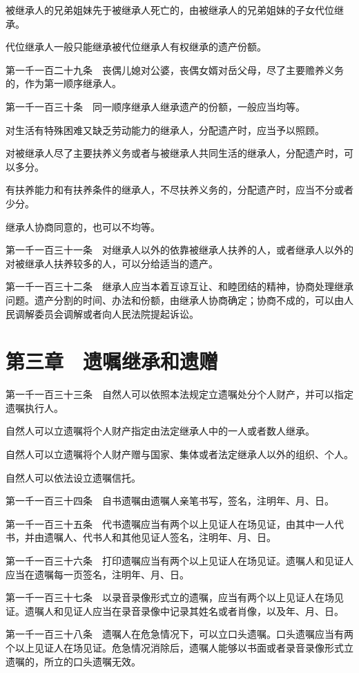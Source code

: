 \documentclass[UTF8,12pt,a4paper]{ctexbook}
\begin{document}
被继承人的兄弟姐妹先于被继承人死亡的，由被继承人的兄弟姐妹的子女代位继承。

代位继承人一般只能继承被代位继承人有权继承的遗产份额。

第一千一百二十九条　丧偶儿媳对公婆，丧偶女婿对岳父母，尽了主要赡养义务的，作为第一顺序继承人。

第一千一百三十条　同一顺序继承人继承遗产的份额，一般应当均等。

对生活有特殊困难又缺乏劳动能力的继承人，分配遗产时，应当予以照顾。

对被继承人尽了主要扶养义务或者与被继承人共同生活的继承人，分配遗产时，可以多分。

有扶养能力和有扶养条件的继承人，不尽扶养义务的，分配遗产时，应当不分或者少分。

继承人协商同意的，也可以不均等。

第一千一百三十一条　对继承人以外的依靠被继承人扶养的人，或者继承人以外的对被继承人扶养较多的人，可以分给适当的遗产。

第一千一百三十二条　继承人应当本着互谅互让、和睦团结的精神，协商处理继承问题。遗产分割的时间、办法和份额，由继承人协商确定；协商不成的，可以由人民调解委员会调解或者向人民法院提起诉讼。

\section*{第三章　遗嘱继承和遗赠}

第一千一百三十三条　自然人可以依照本法规定立遗嘱处分个人财产，并可以指定遗嘱执行人。

自然人可以立遗嘱将个人财产指定由法定继承人中的一人或者数人继承。

自然人可以立遗嘱将个人财产赠与国家、集体或者法定继承人以外的组织、个人。

自然人可以依法设立遗嘱信托。

第一千一百三十四条　自书遗嘱由遗嘱人亲笔书写，签名，注明年、月、日。

第一千一百三十五条　代书遗嘱应当有两个以上见证人在场见证，由其中一人代书，并由遗嘱人、代书人和其他见证人签名，注明年、月、日。

第一千一百三十六条　打印遗嘱应当有两个以上见证人在场见证。遗嘱人和见证人应当在遗嘱每一页签名，注明年、月、日。

第一千一百三十七条　以录音录像形式立的遗嘱，应当有两个以上见证人在场见证。遗嘱人和见证人应当在录音录像中记录其姓名或者肖像，以及年、月、日。

第一千一百三十八条　遗嘱人在危急情况下，可以立口头遗嘱。口头遗嘱应当有两个以上见证人在场见证。危急情况消除后，遗嘱人能够以书面或者录音录像形式立遗嘱的，所立的口头遗嘱无效。
\end{document}
